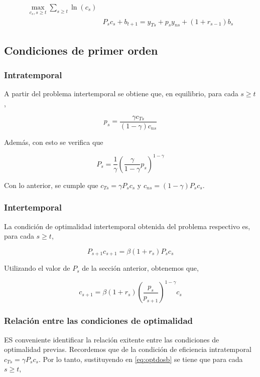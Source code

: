 \documentclass[]{article}
\begin{document}
\[
\begin{align}
\max_{c_s, s \geq t} \sum_{s \geq t} \ln(c_s) \\
& P_s c_s + b_{t+1} = y_{Ts} + p_s y_{ns} + (1 + r_{s-1})b_s
\end{align}
\]

\subsection{Condiciones de primer
orden}\label{condiciones-de-primer-orden-4}

\subsubsection{Intratemporal}\label{intratemporal}

A partir del problema intertemporal se obtiene que, en equilibrio, para
cada \(s \geq t\),

\[
p_s = \frac{\gamma c_{Ts}}{(1-\gamma)c_{ns}}
\]

Además, con esto se verifica que

\[
P_s = \frac{1}{\gamma}\left(\frac{\gamma}{1-\gamma}p_s\right)^{1-\gamma }
\]

Con lo anterior, se cumple que \(c_{Ts} = \gamma P_s c_s\) y
\(c_{ns} = (1-\gamma)P_sc_s\).

\subsubsection{Intertemporal}\label{intertemporal}

La condición de optimalidad intertemporal obtenida del problema
respectivo es, para cada \(s \geq t\),

\[
\begin{equation}
P_{s+1}c_{s+1} = \beta(1 + r_s)P_sc_s
\label{eq:optdosb}
\end{equation}
\]

Utilizando el valor de \(P_s\) de la sección anterior, obtenemos que,

\[
c_{s+1} = \beta(1+r_s)\left(\frac{p_s}{p_{s+1}}\right)^{1 - \gamma}c_s
\]

\subsubsection{Relación entre las condiciones de
optimalidad}\label{relacion-entre-las-condiciones-de-optimalidad}

ES conveniente identificar la relación exitente entre las condiciones de
optimalidad previas. Recordemos que de la condición de eficiencia
intratemporal \(c_{Ts} = \gamma P_sc_s\). Por lo tanto, sustituyendo en
\eqref{eq:optdosb} se tiene que para cada \(s \geq t\),
\end{document}
